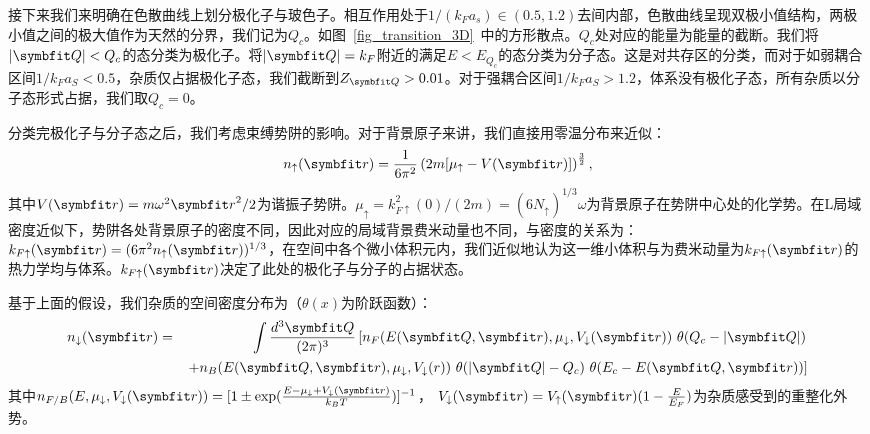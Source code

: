 接下来我们来明确在色散曲线上划分极化子与玻色子。相互作用处于$1/(k_Fa_s)\in(0.5,1.2)$去间内部，色散曲线呈现双极小值结构，两极小值之间的极大值作为天然的分界，我们记为$Q_c$。如图~\ref{fig_transition_3D}~中的方形散点。$Q_c$处对应的能量为能量的截断。我们将$|\Vector{Q}|<Q_c$的态分类为极化子。将$|\Vector{Q}|=k_F$附近的满足$E<E_{Q_c}$的态分类为分子态。这是对共存区的分类，而对于如弱耦合区间$1/k_Fa_S<0.5$，杂质仅占据极化子态，我们截断到$Z_{\Vector{Q}}>0.01$。对于强耦合区间$1/k_Fa_S>1.2$，体系没有极化子态，所有杂质以分子态形式占据，我们取$Q_c=0$。

分类完极化子与分子态之后，我们考虑束缚势阱的影响。对于背景原子来讲，我们直接用零温分布来近似：
\begin{equation}
	n_{\uparrow}(\Vector{r}) = \frac{1}{6\pi^2} \left( 2m [\mu_{\uparrow} - V(\Vector{r})]\right)^{\frac{3}{2}},
\end{equation}
其中$V(\Vector{r})=m\omega^2{\Vector{r} }^2/2$为谐振子势阱。$\mu_{\uparrow}=k^2_{F{\uparrow}}(0)/(2m)  = (6 N_{\uparrow})^{1/3} \omega$为背景原子在势阱中心处的化学势。在L局域密度近似下，势阱各处背景原子的密度不同，因此对应的局域背景费米动量也不同，与密度的关系为：
$k_{F\uparrow}(\Vector{r}) = (6\pi^2n_{\uparrow}(\Vector{r}))^{1/3}$，在空间中各个微小体积元内，我们近似地认为这一维小体积与为费米动量为$k_{F\uparrow}(\Vector{r})$的热力学均与体系。$k_{F\uparrow}(\Vector{r})$决定了此处的极化子与分子的占据状态。

基于上面的假设，我们杂质的空间密度分布为（$\theta(x)$为阶跃函数）：
\begin{eqnarray}
	n_{\downarrow}(\Vector{r}) &=& \int\frac{d^3{\Vector{Q} }}{(2\pi)^3} \left[  n_F(E({\Vector{Q} },{\Vector{r} }),\mu_\downarrow,V_\downarrow({\Vector{r} }))\ \theta(Q_{c}-|{\Vector{Q} }|) \right. \nonumber\\
	&&\left.+ n_B(E({\Vector{Q} },{\Vector{r} }),\mu_\downarrow,V_\downarrow(r) )\ \theta(|{\Vector{Q} }|-Q_c)\ \theta(E_c-E({\Vector{Q} },{\Vector{r} })) \right] \nonumber\\ \label{local_n}
\end{eqnarray}
其中$n_{F/B}(E,\mu_\downarrow,V_\downarrow(\Vector{r})) = [1 \pm \exp(\frac{E-\mu_\downarrow+V_\downarrow(\Vector{r})}{k_B T}) ]^{-1}$， $V_\downarrow(\Vector{r})= V_\uparrow(\Vector{r}) (1- \frac{E}{E_F})$为杂质感受到的重整化外势\cite{Sagi2020,Lobo2006normal}。

